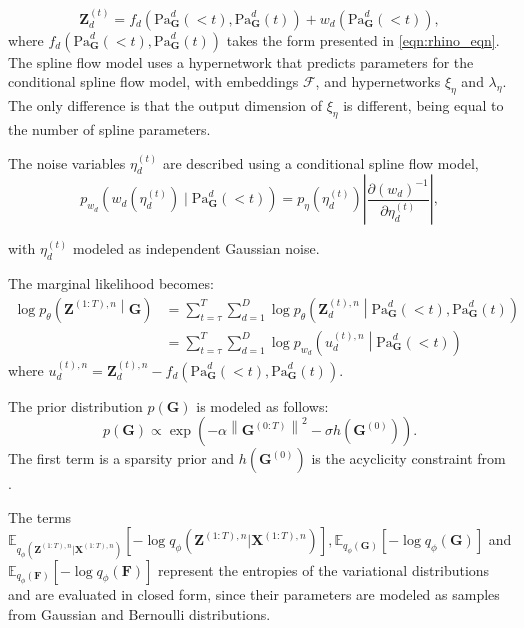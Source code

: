 \begin{equation*}
    \mathbf{Z}_d^{(t)} = f_{d}\left(\text{Pa}^d_\mathbf{G}(<t), \text{Pa}^d_\mathbf{G}(t)\right) + w_{d}\left(\text{Pa}^d_\mathbf{G}(<t)\right),
\end{equation*}
where $\displaystyle f_{d}\left(\text{Pa}^d_\mathbf{G}(<t), \text{Pa}^d_\mathbf{G}(t)\right)$ takes the form presented in \eqref{eqn:rhino_eqn}. The spline flow model uses a hypernetwork that predicts parameters for the conditional spline flow model, with embeddings $\mathscr{F}$, and hypernetworks $\xi_\eta$ and $\lambda_\eta$. The only difference is that the output dimension of $\xi_\eta$ is different, being equal to the number of spline parameters. 

The noise variables $\eta_d^{(t)}$ are described using a conditional spline flow model, 
%
\begin{equation}
    p_{w_d}(w_d(\eta^{(t)}_d) \mid  \text{Pa}_{\mathbf{G}}^d(<t) ) = p_\eta(\eta_d^{(t)}) \left|  \frac{\partial (w_d)^{-1}}{\partial \eta^{(t)}_d}\right|,
\end{equation}

with $\eta_d^{(t)}$ modeled as independent Gaussian noise.  

The marginal likelihood becomes:
\begin{align}
    \log p_\theta \left(\mathbf{Z}^{(1:T), n} \middle|  \mathbf{G} \right) &= \sum_{t=\tau}^T \sum_{d=1}^D \log p_\theta \left( \mathbf{Z}^{(t), n}_{d} \middle|  \text{Pa}_{\mathbf{G}}^d(<t), \text{Pa}_{\mathbf{G}}^d(t) \right) \nonumber \\ &= \sum_{t=\tau}^T \sum_{d=1}^D \log p_{w_d}\left(u_d^{(t), n} \middle| \text{Pa}_{\mathbf{G}}^d(<t) \right)
\end{align}
where $\displaystyle u_{d}^{(t), n} = \mathbf{Z}_d^{(t), n} - f_{d} \left(\text{Pa}_{\mathbf{G}}^d(<t), \text{Pa}_{\mathbf{G}}^d(t) \right)$. 

The prior distribution $p(\mathbf{G})$ is modeled as follows:
\begin{equation}
    p(\mathbf{G}) \propto \exp \left(-\alpha \left\lVert {\mathbf{G}}^{(0:T)}\right\rVert^2 - \sigma h\left(\mathbf{G}^{(0)} \right) \right). \label{eqn:prior_term}
\end{equation}
The first term is a sparsity prior and $h\left(\mathbf{G}^{(0)}\right)$ is the acyclicity constraint from \citet{zheng2018dags}. 

The terms $\mathbb{E}_{q_{\phi}(\mathbf{Z}^{(1:T), n}|\mathbf{X}^{(1:T), n})} \left[  - \log q_{\phi} \left(\mathbf{Z}^{(1:T), n} | \mathbf{X}^{(1:T), n}\right) \right], \mathbb{E}_{q_\phi(\mathbf{G})} {\left[ - \log q_{\phi}(\mathbf{G}) \right]}$ and $\displaystyle \mathbb{E}_{q_\phi(\mathbf{F})} {\left[ - \log q_{\phi}(\mathbf{F}) \right]}$ represent the entropies of the variational distributions and are evaluated in closed form, since their parameters are modeled as samples from Gaussian and Bernoulli distributions.

